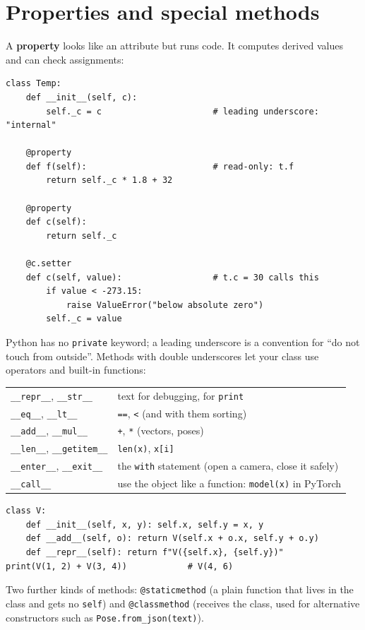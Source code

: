 \section*{Properties and special methods}
A \textbf{property} looks like an attribute but runs code. It computes derived values and can check assignments:
\begin{verbatim}
class Temp:
    def __init__(self, c):
        self._c = c                      # leading underscore: "internal"

    @property
    def f(self):                         # read-only: t.f
        return self._c * 1.8 + 32

    @property
    def c(self):
        return self._c

    @c.setter
    def c(self, value):                  # t.c = 30 calls this
        if value < -273.15:
            raise ValueError("below absolute zero")
        self._c = value
\end{verbatim}
Python has no \texttt{private} keyword; a leading underscore is a convention for ``do not touch from outside''. Methods with double underscores let your class use operators and built-in functions:
\begin{center}
\renewcommand{\arraystretch}{1.2}
\begin{tabular}{p{4.2cm}p{8.8cm}}
\texttt{\_\_repr\_\_}, \texttt{\_\_str\_\_} & text for debugging, for \texttt{print}\\
\texttt{\_\_eq\_\_}, \texttt{\_\_lt\_\_} & \texttt{==}, \texttt{<} (and with them sorting)\\
\texttt{\_\_add\_\_}, \texttt{\_\_mul\_\_} & \texttt{+}, \texttt{*} (vectors, poses)\\
\texttt{\_\_len\_\_}, \texttt{\_\_getitem\_\_} & \texttt{len(x)}, \texttt{x[i]}\\
\texttt{\_\_enter\_\_}, \texttt{\_\_exit\_\_} & the \texttt{with} statement (open a camera, close it safely)\\
\texttt{\_\_call\_\_} & use the object like a function: \texttt{model(x)} in PyTorch\\
\end{tabular}
\end{center}
\begin{verbatim}
class V:
    def __init__(self, x, y): self.x, self.y = x, y
    def __add__(self, o): return V(self.x + o.x, self.y + o.y)
    def __repr__(self): return f"V({self.x}, {self.y})"
print(V(1, 2) + V(3, 4))            # V(4, 6)
\end{verbatim}
Two further kinds of methods: \verb!@staticmethod! (a plain function that lives in the class and gets no \texttt{self}) and \verb!@classmethod! (receives the class, used for alternative constructors such as \verb!Pose.from_json(text)!).

